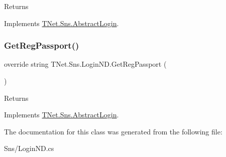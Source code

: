 \begin{DoxyReturn}{Returns}

\end{DoxyReturn}


Implements \mbox{\hyperlink{class_t_net_1_1_sns_1_1_abstract_login_a6b5dac3d6d46efb7b1e4049e674105e5}{T\+Net.\+Sns.\+Abstract\+Login}}.

\mbox{\label{class_t_net_1_1_sns_1_1_login_n_d_a3f84b2292edbc7310abbe64f757f37db}} 
\subsubsection{\texorpdfstring{Get\+Reg\+Passport()}{GetRegPassport()}}
{\footnotesize\ttfamily override string T\+Net.\+Sns.\+Login\+N\+D.\+Get\+Reg\+Passport (\begin{DoxyParamCaption}{ }\end{DoxyParamCaption})\hspace{0.3cm}{\ttfamily [virtual]}}





\begin{DoxyReturn}{Returns}

\end{DoxyReturn}


Implements \mbox{\hyperlink{class_t_net_1_1_sns_1_1_abstract_login_a3930eb564bb4804e1b646d749f20907a}{T\+Net.\+Sns.\+Abstract\+Login}}.



The documentation for this class was generated from the following file\+:\begin{DoxyCompactItemize}
\item 
Sns/Login\+N\+D.\+cs\end{DoxyCompactItemize}
